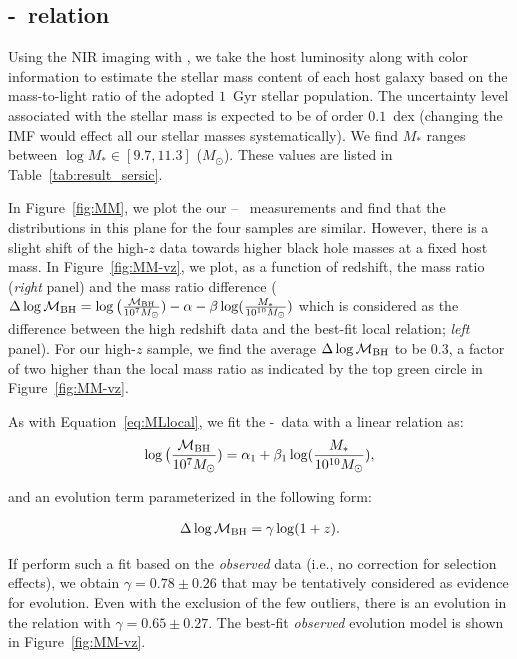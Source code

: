 \documentclass[apj]{emulateapj}
\begin{document}
\subsection{\mbh-\smass\ relation}\label{sec:mm}

Using the NIR imaging with \hst, we take the host luminosity along with color information to estimate the stellar mass content of each host galaxy based on the mass-to-light ratio of the adopted  $1$~Gyr stellar population. The uncertainty level associated with the stellar mass is expected to be of order $0.1$~dex (changing the IMF would effect all our stellar masses systematically). We find $M_*$ ranges between $\log M_* \in [9.7, 11.3]$ ($M_{\odot}$). These values are listed in Table~\ref{tab:result_sersic}. 

In Figure~\ref{fig:MM}, we plot the our \mbh -- \smass\ measurements and find that the distributions in this plane for the four samples are similar. However, there is a slight shift of the high-$z$ data towards higher black hole masses at a fixed host mass. In Figure~\ref{fig:MM-vz}, we plot, as a function of redshift, the mass ratio ({\it right} panel) and the mass ratio difference ($\Delta \log \mathcal M_{\rm BH} = \log \big( \frac{\mathcal M_{\rm  BH}}{10^{7}M_{\odot}}) -\alpha-\beta\log(\frac{M_*}{10^{10}M_{\odot}})$ which is considered as the difference between the high redshift data and the best-fit local relation; {\it left} panel). For our high-$z$ sample, we find the average $\Delta \log \mathcal M_{\rm BH}$ to be 0.3, a factor of two higher than the local mass ratio as indicated by the top green circle in Figure~\ref{fig:MM-vz}.

As with Equation~\ref{eq:MLlocal}, we fit the \mbh-\smass\ data with a linear relation as:
\begin{eqnarray}
\label{eq:MMlocal}
\log \big( \frac{\mathcal M_{\rm BH}}{10^{7}M_{\odot}})= \alpha_1 + \beta_1 \log(\frac{M_*}{10^{10}M_{\odot}}),
\end {eqnarray}

\noindent and an evolution term parameterized in the following form:

\begin{eqnarray}
\label{eq:offset}
\Delta \log \mathcal M_{\rm BH}= \gamma \log (1 + z).
\end{eqnarray} 

If perform such a fit based on the {\it observed} data (i.e., no correction for selection effects), we obtain $\gamma  = 0.78 \pm 0.26$ that may be tentatively considered as evidence for evolution. Even with the exclusion of the few outliers, there is an evolution in the relation with $\gamma  = 0.65 \pm 0.27$. The best-fit {\it observed} evolution model is shown in Figure~\ref{fig:MM-vz}.
\end{document}
